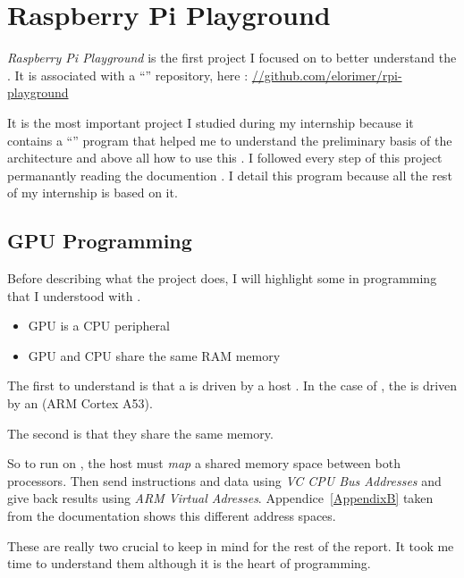 \section{Raspberry Pi Playground}

\emph{Raspberry Pi Playground} \parencite{refRpiPlayground} is the first project I focused on to better understand the \vc. It is associated with a \enquote{} repository, here : \url{//github.com/elorimer/rpi-playground}

It is the most important project I studied during my internship because it contains a \enquote{} program that helped me to understand the preliminary basis of the \vc{} architecture and above all how to use this . I followed every step of this project permanantly reading the \vc{} documention \parencite{refVC}. I detail this program because all the rest of my internship is based on it.


\subsection{GPU Programming}
\label{concepts}
Before describing what the  project does, I will highlight some  in \vc{} programming that I understood with \parencite{refRpiPlayground}.

\begin{itemize}
	\item GPU is a CPU peripheral
	\item GPU and CPU share the same RAM memory
\end{itemize}

The first  to understand is that a  is driven by a host . In the case of \bcm, the \vc{} is driven by an \cpu{}(ARM Cortex A53).

The second  is that they share the same  memory.

So to run  on , the host  must \emph{map} a shared memory space between both processors. Then  send instructions and data using \emph{VC CPU Bus Addresses} and  give back results using \emph{ARM Virtual Adresses}.
Appendice~\ref{AppendixB} taken from the \bcm{} documentation \parencite{refBCM} shows this different address spaces.

These are really two crucial  to keep in mind for the rest of the report. It took me time to understand them although it is the heart of \vc{} programming.


